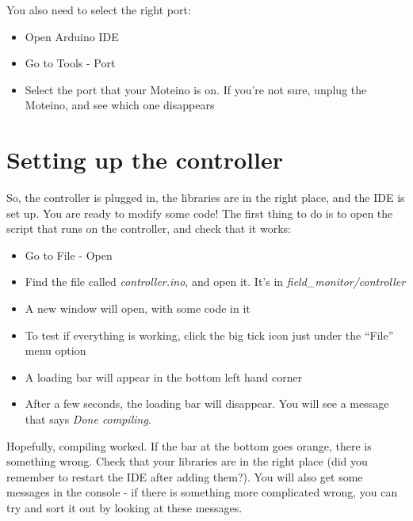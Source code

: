 \documentclass[10pt]{article}
\begin{document}
You also need to select the right port:

\begin{itemize}
 \item Open Arduino IDE 
 \item Go to Tools - Port
 \item Select the port that your Moteino is on. If you're not sure, unplug the Moteino, and see which one disappears
\end{itemize}

\section{Setting up the controller}

So, the controller is plugged in, the libraries are in the right place, and the IDE is set up. You are ready to modify some code! The first thing to do is to open the script that runs on the controller, and check that it works:

\begin{itemize}
 \item Go to File - Open
 \item Find the file called \textit{controller.ino}, and open it. It's in \textit{field\_monitor/controller}
 \item A new window will open, with some code in it
 \item To test if everything is working, click the big tick icon just under the ``File'' menu option
 \item A loading bar will appear in the bottom left hand corner
 \item After a few seconds, the loading bar will disappear. You will see a message that says \textit{Done compiling.}
\end{itemize}

Hopefully, compiling worked. If the bar at the bottom goes orange, there is something wrong. Check that your libraries are in the right place (did you remember to restart the IDE after adding them?). You will also get some messages in the console - if there is something more complicated wrong, you can try and sort it out by looking at these messages.
\end{document}
